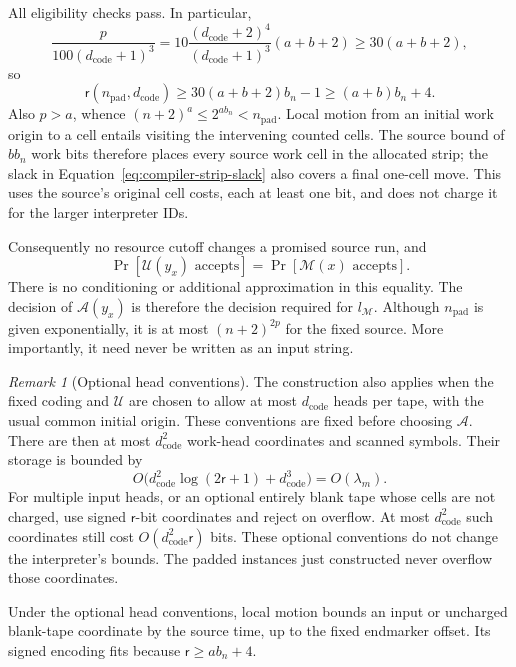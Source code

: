 \documentclass[11pt]{article}
\numberwithin{equation}{section}
\theoremstyle{definition}
\theoremstyle{remark}
\newtheorem{remark}[theorem]{Remark}
\begin{document}
All eligibility checks pass.  In particular,
\[
 \frac{{p}}{100(d_{\mathrm{code}}+1)^3}
 =10\frac{(d_{\mathrm{code}}+2)^4}
          {(d_{\mathrm{code}}+1)^3}(a+b+2)
 \ge30(a+b+2),
\]
so
\begin{equation}\label{eq:compiler-strip-slack}
 {\mathsf{r}}({n}_{\mathrm{pad}},d_{\mathrm{code}})
 \ge30(a+b+2){b}_n-1\ge(a+b){b}_n+4.
\end{equation}
Also ${p}>a$, whence
$(n+2)^a\le2^{a{b}_n}<{n}_{\mathrm{pad}}$.
Local motion from an initial work origin to a cell entails visiting
the intervening counted cells.  The source bound of $b{b}_n$ work bits
therefore places every source work cell in the allocated strip;
the slack in Equation~\eqref{eq:compiler-strip-slack} also covers a final
one-cell move.  This uses the source's original cell costs, each at
least one bit, and does not charge it for the larger interpreter IDs.

Consequently no resource cutoff changes a promised source run, and
\begin{equation}\label{eq:compiler-exact-probability}
 \Pr[{\mathcal{U}}(y_x)\text{ accepts}]=\Pr[{\mathcal{M}}(x)\text{ accepts}].
\end{equation}
There is no conditioning or additional approximation in this equality.
The decision of ${\mathcal{A}}(y_x)$ is therefore the decision required for ${l}_{\mathcal{M}}$.
Although ${n}_{\mathrm{pad}}$ is given exponentially, it is at most
$(n+2)^{2{p}}$ for the fixed source.  More importantly, it need never
be written as an input string.

\begin{remark}[Optional head conventions]
The construction also applies when the fixed coding and ${\mathcal{U}}$ are chosen
to allow at most $d_{\mathrm{code}}$ heads per tape, with the usual common
initial origin. These conventions are fixed before choosing ${\mathcal{A}}$.
There are then at most $d_{\mathrm{code}}^2$ work-head coordinates and
scanned symbols.  Their storage is bounded by
\[
 O\bigl(d_{\mathrm{code}}^2\log(2{\mathsf{r}}+1)
          +d_{\mathrm{code}}^3\bigr)=O(\lambda_m).
\]
For multiple input heads, or an optional entirely blank tape whose
cells are not charged, use signed ${\mathsf{r}}$-bit coordinates and reject on
overflow.  At most $d_{\mathrm{code}}^2$ such coordinates still cost
$O(d_{\mathrm{code}}^2{\mathsf{r}})$ bits.  These optional conventions do not
change the interpreter's bounds. The padded instances just constructed
never overflow those coordinates.

Under the optional head conventions, local motion bounds an input or
uncharged blank-tape coordinate by the source time, up to the fixed
endmarker offset.  Its signed encoding fits because ${\mathsf{r}}\ge a{b}_n+4$.
\end{remark}
\end{document}
